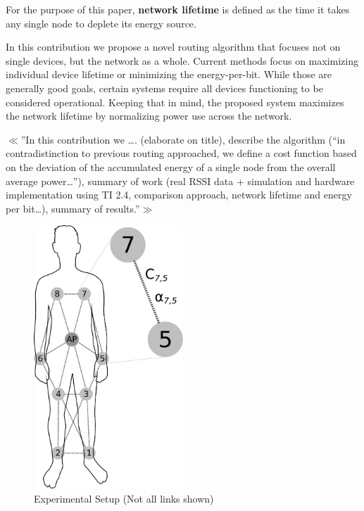 \documentclass{article}
\begin{document}
For the purpose of this paper, \textbf{network lifetime} is defined as the time it takes any single node to deplete its energy source. 

In this contribution we propose a novel routing algorithm that focuses not on single devices, but the network as a whole. Current methods focus on maximizing individual device lifetime or minimizing the energy-per-bit. While those are generally good goals, certain systems require all devices functioning to be considered operational. Keeping that in mind, the proposed system maximizes the network lifetime by normalizing power use across the network.

$\ll$”In this contribution we …. (elaborate on title), describe the algorithm (“in contradistinction to previous routing approached, we define a cost function based on the deviation of the accumulated energy of a single node from the overall average power…”), summary of work (real RSSI data + simulation and hardware implementation using TI 2.4, comparison approach, network lifetime and energy per bit…), summary of results.”$\gg$ 

\begin{figure}[!htb]
\begin{center}
\includegraphics[width=0.5\textwidth]{figures/body.pdf}
\end{center}
\caption{Experimental Setup (Not all links shown)}
\label{fig:body}
\end{figure}
\end{document}
